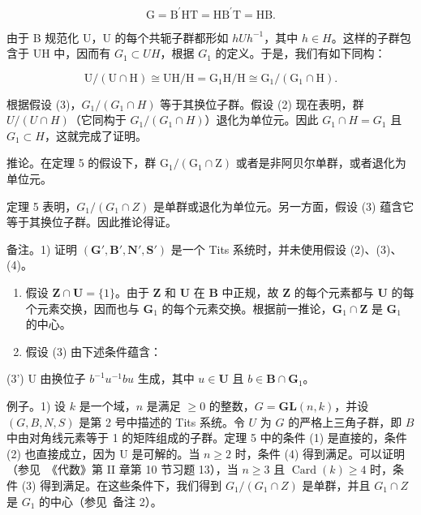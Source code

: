 \[
\mathrm{G} = \mathrm{B} ^ {\prime} \mathrm{HT} = \mathrm{HB} ^ {\prime} \mathrm{T} = \mathrm{HB}.
\]

由于 B 规范化 U，U 的每个共轭子群都形如 \(hUh^{-1}\)，其中 \(h \in H\)。这样的子群包含于 UH 中，因而有 \(G_{1} \subset UH\)，根据 \(G_{1}\) 的定义。于是，我们有如下同构：

\[
\mathrm{U} / (\mathrm{U} \cap \mathrm{H}) \cong \mathrm{UH} / \mathrm{H} = \mathrm{G} _ {1} \mathrm{H} / \mathrm{H} \cong \mathrm{G} _ {1} / (\mathrm{G} _ {1} \cap \mathrm{H}).
\]

根据假设 (3)，\(G_{1}/(G_{1} \cap H)\) 等于其换位子群。假设 (2) 现在表明，群 \(U/(U \cap H)\)（它同构于 \(G_{1}/(G_{1} \cap H)\)）退化为单位元。因此 \(G_{1} \cap H = G_{1}\) 且 \(G_{1} \subset H\)，这就完成了证明。

推论。在定理 5 的假设下，群 \(\mathrm{G}_{1}/(\mathrm{G}_{1} \cap \mathrm{Z})\) 或者是非阿贝尔单群，或者退化为单位元。

定理 5 表明，\(G_{1}/(G_{1} \cap Z)\) 是单群或退化为单位元。另一方面，假设 (3) 蕴含它等于其换位子群。因此推论得证。

备注。1) 证明 \((\mathbf{G}', \mathbf{B}', \mathbf{N}', \mathbf{S}')\) 是一个 Tits 系统时，并未使用假设 (2)、(3)、(4)。

\begin{enumerate}
\def\labelenumi{\arabic{enumi})}
\setcounter{enumi}{1}
\item
  假设 \(\mathbf{Z} \cap \mathbf{U} = \{1\}\)。由于 \(\mathbf{Z}\) 和 \(\mathbf{U}\) 在 \(\mathbf{B}\) 中正规，故 \(\mathbf{Z}\) 的每个元素都与 \(\mathbf{U}\) 的每个元素交换，因而也与 \(\mathbf{G}_1\) 的每个元素交换。根据前一推论，\(\mathbf{G}_1 \cap \mathbf{Z}\) 是 \(\mathbf{G}_1\) 的中心。
\item
  假设 (3) 由下述条件蕴含：
\end{enumerate}

(3') U 由换位子 \(b^{-1}u^{-1}bu\) 生成，其中 \(u \in \mathbf{U}\) 且 \(b \in \mathbf{B} \cap \mathbf{G}_1\)。

例子。1) 设 \(k\) 是一个域，\(n\) 是满足 \(\geqslant 0\) 的整数，\(G = \mathbf{GL}(n, k)\)，并设 \((G, B, N, S)\) 是第 2 号中描述的 Tits 系统。令 \(U\) 为 \(G\) 的严格上三角子群，即 \(B\) 中由对角线元素等于 1 的矩阵组成的子群。定理 5 中的条件 (1) 是直接的，条件 (2) 也直接成立，因为 U 是可解的。当 \(n \geqslant 2\) 时，条件 (4) 得到满足。可以证明（参见~《代数》第 II 章第 10 节习题 13），当 \(n \geqslant 3\) 且 \(\operatorname{Card}(k) \geqslant 4\) 时，条件 (3) 得到满足。在这些条件下，我们得到 \(G_{1}/(G_{1} \cap Z)\) 是单群，并且 \(G_{1} \cap Z\) 是 \(G_{1}\) 的中心（参见~备注 2）。

